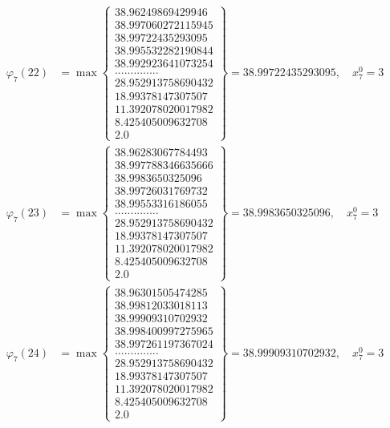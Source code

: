 \documentclass{article}
\begin{document}
\begin{align*}
  
  
  
\varphi_{7}(22) &= \max \left\{ \begin{array}{c}
38.96249869429946 \\
 38.997060272115945 \\
 38.99722435293095 \\
 38.995532282190844 \\
 38.992923641073254 \\
 .............. \\
 28.952913758690432 \\
 18.99378147307507 \\
 11.392078020017982 \\
 8.425405009632708 \\
 2.0
\end{array} \right\} = 38.99722435293095, \quad x_{7}^0 = 3\\
  
  
  
  
\varphi_{7}(23) &= \max \left\{ \begin{array}{c}
38.96283067784493 \\
 38.997788346635666 \\
 38.9983650325096 \\
 38.99726031769732 \\
 38.99553316186055 \\
 .............. \\
 28.952913758690432 \\
 18.99378147307507 \\
 11.392078020017982 \\
 8.425405009632708 \\
 2.0
\end{array} \right\} = 38.9983650325096, \quad x_{7}^0 = 3\\
  
  
  
  
\varphi_{7}(24) &= \max \left\{ \begin{array}{c}
38.96301505474285 \\
 38.99812033018113 \\
 38.99909310702932 \\
 38.998400997275965 \\
 38.997261197367024 \\
 .............. \\
 28.952913758690432 \\
 18.99378147307507 \\
 11.392078020017982 \\
 8.425405009632708 \\
 2.0
\end{array} \right\} = 38.99909310702932, \quad x_{7}^0 = 3\\
  

\end{align*}
\end{document}
